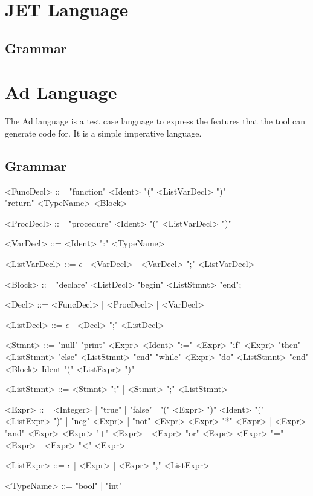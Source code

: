 \appendix

\chapter{JET Language}
\label{appendix:jetLanguage}
\section{Grammar}

\chapter{Ad Language}
\label{appendix:AdLanguage}
The Ad language is a test case language to express the features that the tool can generate code for.
It is a simple imperative language.
\section{Grammar}
\begin{grammar}
    <FuncDecl> ::= "function" <Ident> "(" <ListVarDecl> ")"
    \\"return" <TypeName> <Block>
    
    <ProcDecl> ::= "procedure" <Ident> "(" <ListVarDecl> ")"

    <VarDecl> ::= <Ident> ":" <TypeName>

    <ListVarDecl> ::= $\epsilon$ | <VarDecl> | <VarDecl> ";" <ListVarDecl>

    <Block> ::= "declare" <ListDecl> "begin" <ListStmnt> "end";

    <Decl> ::= <FuncDecl> | <ProcDecl> | <VarDecl>

    <ListDecl> ::= $\epsilon$ | <Decl> ";" <ListDecl>

    <Stmnt> ::= "null"
    \alt "print" <Expr>
    \alt <Ident> ":=" <Expr>
    \alt "if" <Expr> "then" <ListStmnt> "else" <ListStmnt> "end"
    \alt "while" <Expr> "do" <ListStmnt> "end"
    \alt <Block>
    \alt Ident "(" <ListExpr> ")"

    <ListStmnt> ::= <Stmnt> ";" | <Stmnt> ";" <ListStmnt>

    <Expr> ::= <Integer> | "true" | "false" | "(" <Expr> ")"
    \alt <Ident> "(" <ListExpr> ")" | "neg" <Expr> | "not" <Expr>
    \alt <Expr> "*" <Expr> | <Expr> "and" <Expr>
    \alt <Expr> "+" <Expr> | <Expr> "or" <Expr>
    \alt <Expr> "=" <Expr> | <Expr> "<" <Expr>

    <ListExpr> ::= $\epsilon$ | <Expr> | <Expr> "," <ListExpr>

    <TypeName> ::= "bool" | "int"
\end{grammar}
